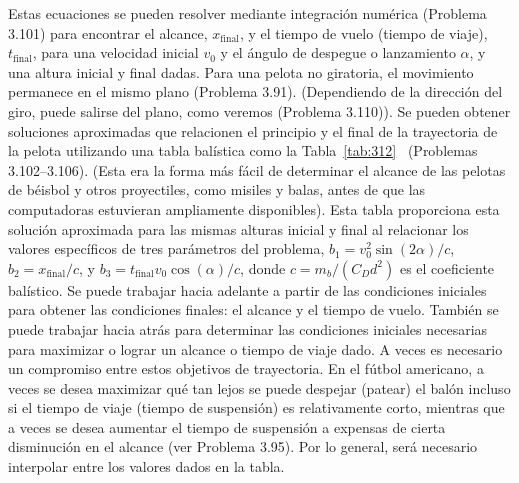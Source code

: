\documentclass[12pt]{book}
\begin{document}
Estas ecuaciones se pueden resolver mediante integración numérica (Problema 3.101) para encontrar el alcance, $x_{\text{final}}$, y el tiempo de vuelo (tiempo de viaje), $t_{\text{final}}$, para una velocidad inicial $v_0$ y el ángulo de despegue o lanzamiento $\alpha$, y una altura inicial y final dadas. Para una pelota no giratoria, el movimiento permanece en el mismo plano (Problema 3.91). (Dependiendo de la dirección del giro, puede salirse del plano, como veremos (Problema 3.110)). Se pueden obtener soluciones aproximadas que relacionen el principio y el final de la trayectoria de la pelota utilizando una tabla balística como la Tabla~\ref{tab:312}~\cite{ref36,ref37} (Problemas 3.102--3.106). (Esta era la forma más fácil de determinar el alcance de las pelotas de béisbol y otros proyectiles, como misiles y balas, antes de que las computadoras estuvieran ampliamente disponibles). Esta tabla proporciona esta solución aproximada para las mismas alturas inicial y final al relacionar los valores específicos de tres parámetros del problema, $b_1 = v_0^2 \sin(2\alpha)/c$, $b_2 = x_{\text{final}}/c$, y $b_3 = t_{\text{final}} v_0 \cos(\alpha)/c$, donde $c = m_b/(C_D d^2)$ es el coeficiente balístico. Se puede trabajar hacia adelante a partir de las condiciones iniciales para obtener las condiciones finales: el alcance y el tiempo de vuelo. También se puede trabajar hacia atrás para determinar las condiciones iniciales necesarias para maximizar o lograr un alcance o tiempo de viaje dado. A veces es necesario un compromiso entre estos objetivos de trayectoria. En el fútbol americano, a veces se desea maximizar qué tan lejos se puede despejar (patear) el balón incluso si el tiempo de viaje (tiempo de suspensión) es relativamente corto, mientras que a veces se desea aumentar el tiempo de suspensión a expensas de cierta disminución en el alcance (ver Problema 3.95). Por lo general, será necesario interpolar entre los valores dados en la tabla.
\end{document}
